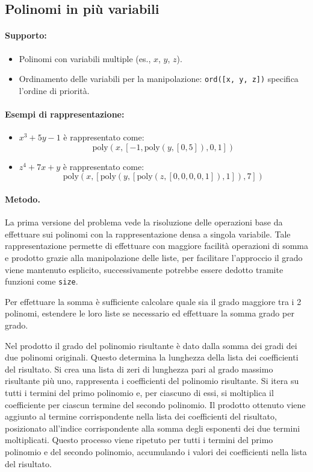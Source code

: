 \documentclass[12pt,twoside]{report}
\begin{document}
\subsection*{Polinomi in più variabili}
\paragraph{Supporto:}
\begin{itemize}
    \item Polinomi con variabili multiple (es., $x$, $y$, $z$).
    \item Ordinamento delle variabili per la manipolazione: \texttt{ord([x, y, z])} specifica l'ordine di priorità.
\end{itemize}

\paragraph{Esempi di rappresentazione:}
\begin{itemize}
    \item $x^3 + 5y - 1$ è rappresentato come:
    \[
    \text{poly}(x, [-1, \text{poly}(y, [0, 5]), 0, 1])
    \]
    \item $z^4 + 7x + y$ è rappresentato come:
    \[
    \text{poly}(x, [\text{poly}(y, [\text{poly}(z, [0, 0, 0, 0, 1]), 1]), 7])
    \]
\end{itemize}

\paragraph{Metodo.} La prima versione del problema vede la risoluzione delle operazioni base da effettuare sui polinomi con la rappresentazione densa a singola variabile. Tale rappresentazione permette di effettuare con maggiore facilità operazioni di somma e prodotto grazie alla manipolazione delle liste, per facilitare l'approccio il grado viene mantenuto esplicito, successivamente potrebbe essere dedotto tramite funzioni come \texttt{size}.

Per effettuare la somma è sufficiente calcolare quale sia il grado maggiore tra i 2 polinomi, estendere le loro liste se necessario ed effettuare la somma grado per grado.

Nel prodotto il grado del polinomio risultante è dato dalla somma dei gradi dei due polinomi originali. Questo determina la lunghezza della lista dei coefficienti del risultato. Si crea una lista di zeri di lunghezza pari al grado massimo risultante più uno, rappresenta i coefficienti del polinomio risultante. Si itera su tutti i termini del primo polinomio e, per ciascuno di essi, si moltiplica il coefficiente per ciascun termine del secondo polinomio. Il prodotto ottenuto viene aggiunto al termine corrispondente nella lista dei coefficienti del risultato, posizionato all'indice corrispondente alla somma degli esponenti dei due termini moltiplicati. Questo processo viene ripetuto per tutti i termini del primo polinomio e del secondo polinomio, accumulando i valori dei coefficienti nella lista del risultato.
\end{document}
